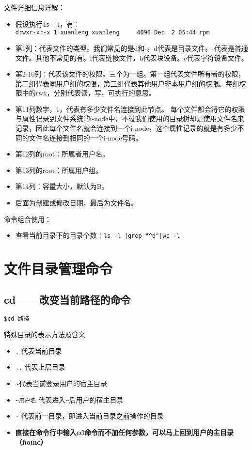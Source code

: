 文件详细信息详解：
\begin{itemize}
\item 假设执行\verb|ls -l|，有：\\
\verb|drwxr-xr-x 1 xuanleng xuanleng     4096 Dec  2 05:44 rpm|

\item 第1列：代表文件的类型。我们常见的是d和-。d代表是目录文件。-代表是普通文件。其他不常见的有。l代表链接文件，b代表块设备。c代表字符设备文件。

\item 第2-10列：代表该文件的权限。三个为一组。第一组代表文件所有者的权限，第二组代表同用户组的权限，第三组代表其他用户非本用户组的权限。每组权限中的rwx，分别代表读，写，可执行的意思。

\item 第11列数字，1，代表有多少文件名连接到此节点。
每个文件都会将它的权限与属性记录到文件系统的i-node中，不过我们使用的目录树却是使用文件名来记录，因此每个文件名就会连接到一个i-node，这个属性记录的就是有多少不同的文件名连接到相同的一个i-node号码。

\item 第12列的root：所属者用户名。

\item 第13列的root：所属用户组。

\item 第14列：容量大小，默认为B。

\item 后面为创建或修改日期，最后为文件名。
\end{itemize}

命令组合使用：
\begin{itemize}
\item 查看当前目录下的目录个数：\verb?ls -l |grep "^d"|wc -l?
\end{itemize}



\section{文件目录管理命令}
\subsection{cd——改变当前路径的命令}
\verb*|$cd 路径|

特殊目录的表示方法及含义
\begin{itemize}
\item \verb|.| 代表当前目录
\item \verb|..| 代表上层目录
\item \verb|~|代表当前登录用户的宿主目录
\item \verb|~用户名| 代表进入\verb|~|后用户的宿主目录
\item \verb|-| 代表前一目录，即进入当前目录之前操作的目录
\item \textbf{直接在命令行中输入cd命令而不加任何参数，可以马上回到用户的主目录（home）}
\end{itemize}


